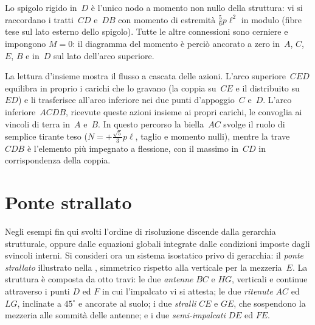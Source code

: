 

\begin{oss}
	Lo spigolo rigido in~$D$ è l'unico nodo a momento non
	nullo della struttura: vi si raccordano i tratti~$CD$
	e~$DB$ con momento di estremità $\tfrac56 p\ell^2$ in
	modulo (fibre tese sul lato esterno dello spigolo).
	Tutte le altre connessioni sono cerniere e impongono
	$M = 0$: il diagramma del momento è perciò ancorato a
	zero in~$A$, $C$, $E$, $B$ e in~$D$ sul lato dell'arco
	superiore.
\end{oss}


\begin{oss}
	La lettura d'insieme mostra il flusso a cascata delle
	azioni. L'arco superiore~$CED$ equilibra in proprio i
	carichi che lo gravano (la coppia su~$CE$ e il
	distribuito su~$ED$) e li trasferisce all'arco inferiore
	nei due punti d'appoggio~$C$ e~$D$. L'arco
	inferiore~$ACDB$, ricevute queste azioni insieme ai
	propri carichi, le convoglia ai vincoli di terra in~$A$
	e~$B$. In questo percorso la biella~$AC$ svolge il ruolo
	di semplice tirante teso ($N = +\tfrac{\sqrt5}{3}p\ell$,
	taglio e momento nulli), mentre la trave~$CDB$ è
	l'elemento più impegnato a flessione, con il massimo
	in~$CD$ in corrispondenza della coppia.
\end{oss}




\section{Ponte strallato}
\label{sec:ponte_strallato}

Negli esempi fin qui svolti l'ordine di risoluzione
discende dalla gerarchia strutturale, oppure dalle
equazioni globali integrate dalle condizioni imposte dagli
svincoli interni. Si consideri ora un sistema isostatico
privo di gerarchia: il \emph{ponte
strallato} illustrato nella
, simmetrico rispetto alla
verticale per la mezzeria~$E$. La struttura è composta da
otto travi: le due \emph{antenne} $BC$ e $HG$, verticali e
continue attraverso i punti $D$ ed $F$ in cui l'impalcato vi
si attesta; le due \emph{ritenute} $AC$ ed $LG$, inclinate a
$45^{\circ}$ e ancorate al suolo; i due \emph{stralli} $CE$
e $GE$, che sospendono la mezzeria alle sommità delle
antenne; e i due \emph{semi-impalcati} $DE$ ed $FE$.


